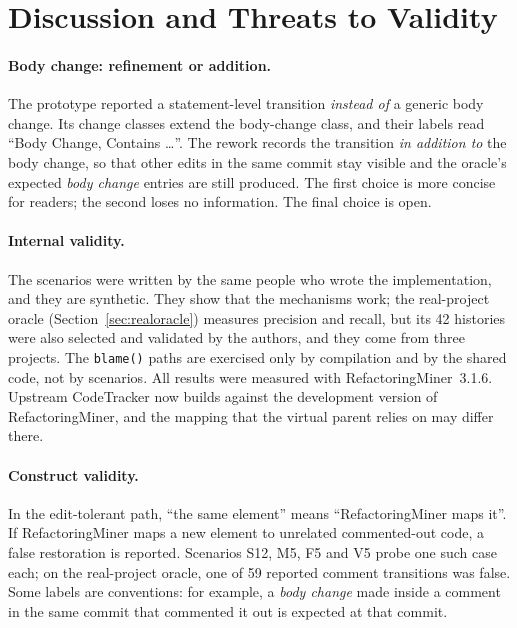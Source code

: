 \documentclass[11pt,a4paper]{article}
\newcommand{\code}[1]{\texttt{#1}}
\newcommand{\change}[1]{\textit{#1}}
\begin{document}
\section{Discussion and Threats to Validity}\label{sec:threats}

\paragraph{Body change: refinement or addition.} The prototype reported a statement-level transition \emph{instead of} a generic body change. Its change classes extend the body-change class, and their labels read ``Body Change, Contains \ldots''. The rework records the transition \emph{in addition to} the body change, so that other edits in the same commit stay visible and the oracle's expected \change{body change} entries are still produced. The first choice is more concise for readers; the second loses no information. The final choice is open.

\paragraph{Internal validity.} The scenarios were written by the same people who wrote the implementation, and they are synthetic. They show that the mechanisms work; the real-project oracle (Section~\ref{sec:realoracle}) measures precision and recall, but its 42 histories were also selected and validated by the authors, and they come from three projects. The \code{blame()} paths are exercised only by compilation and by the shared code, not by scenarios. All results were measured with RefactoringMiner~3.1.6. Upstream CodeTracker now builds against the development version of RefactoringMiner, and the mapping that the virtual parent relies on may differ there.

\paragraph{Construct validity.} In the edit-tolerant path, ``the same element'' means ``RefactoringMiner maps it''. If RefactoringMiner maps a new element to unrelated commented-out code, a false restoration is reported. Scenarios S12, M5, F5 and V5 probe one such case each; on the real-project oracle, one of 59 reported comment transitions was false. Some labels are conventions: for example, a \change{body change} made inside a comment in the same commit that commented it out is expected at that commit.
\end{document}

